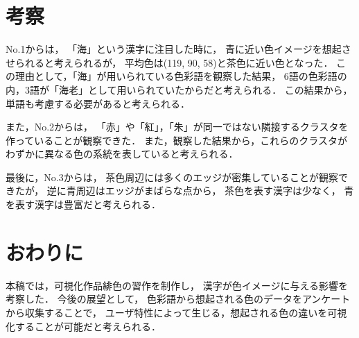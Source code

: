 \documentclass[a4j,twocolumn]{ujarticle} %
\newcommand{\workname}{緋色の習作}
\newcommand{\colorname}{色彩語}
\newcommand{\recallcolor}{色イメージ}
\newcommand{\mysection}[1]{\vspace{-20pt}\section{#1}}
\begin{document}

\mysection{考察}

No.1からは，
「海」という漢字に注目した時に，
青に近い\recallcolor{}を想起させられると考えられるが，
平均色は(119, 90, 58)と茶色に近い色となった．
この理由として，「海」が用いられている\colorname{}を観察した結果，
6語の\colorname{}の内，3語が「海老」として用いられていたからだと考えられる．
この結果から，単語も考慮する必要があると考えられる．

また，No.2からは，
「赤」や「紅」，「朱」が同一ではない隣接するクラスタを作っていることが観察できた．
また，観察した結果から，これらのクラスタがわずかに異なる色の系統を表していると考えられる．

最後に，No.3からは，
茶色周辺には多くのエッジが密集していることが観察できたが，
逆に青周辺はエッジがまばらな点から，
茶色を表す漢字は少なく，
青を表す漢字は豊富だと考えられる．

\mysection{おわりに}

本稿では，可視化作品\workname{}を制作し，
漢字が\recallcolor{}に与える影響を考察した．
今後の展望として，
\colorname{}から想起される色のデータをアンケートから収集することで，
ユーザ特性によって生じる，想起される色の違いを可視化することが可能だと考えられる．




\end{document}
